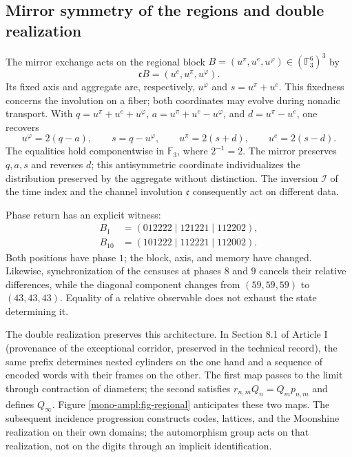 \subsection{Mirror symmetry of the regions and double realization}
\label{mono-ampl:regiones}

The mirror exchange acts on the regional block
\(B=(u^\pi,u^e,u^\varphi)\in(\mathbb F_3^6)^3\) by
\[
 \mathfrak cB=(u^e,u^\pi,u^\varphi).
\]
Its fixed axis and aggregate are, respectively, \(u^\varphi\) and
\(s=u^\pi+u^e\). This fixedness concerns the involution on a fiber;
both coordinates may evolve during nonadic transport.
With \(q=u^\pi+u^e+u^\varphi\),
\(a=u^\pi+u^e-u^\varphi\), and \(d=u^\pi-u^e\), one recovers
\[
 u^\varphi=2(q-a),\qquad s=q-u^\varphi,\qquad
 u^\pi=2(s+d),\qquad u^e=2(s-d).
\]
The equalities hold componentwise in \(\mathbb F_3\), where
\(2^{-1}=2\). The mirror preserves \(q,a,s\) and reverses \(d\); this
antisymmetric coordinate individualizes the distribution preserved
by the aggregate without distinction. The inversion \(\mathcal I\) of the time index and the
channel involution \(\mathfrak c\) consequently act on
different data.

Phase return has an explicit witness:
\[
 \begin{aligned}
 B_1&=(012222\mid121221\mid112202),\\
 B_{10}&=(101222\mid112221\mid112002).
 \end{aligned}
\]
Both positions have phase \(1\); the block, axis, and memory have
changed. Likewise, synchronization of the censuses at phases \(8\) and
\(9\) cancels their relative differences, while the diagonal component
changes from \((59,59,59)\) to \((43,43,43)\). Equality of a relative observable
does not exhaust the state determining it.

The double realization preserves this architecture. In Section
8.1 of Article I (provenance of the exceptional corridor, preserved in the technical record), the same prefix determines nested
cylinders on the one hand and a sequence of encoded words with their frames on the other.
The first map passes to the limit through contraction of diameters; the second
satisfies \(r_{n,m}Q_n=Q_mp_{n,m}\) and defines \(Q_\infty\).
Figure \ref{mono-ampl:fig-regional} anticipates these two maps.
The subsequent incidence progression constructs codes, lattices, and the
Moonshine realization on their own domains; the automorphism group
acts on that realization, not on the digits through an
implicit identification.


